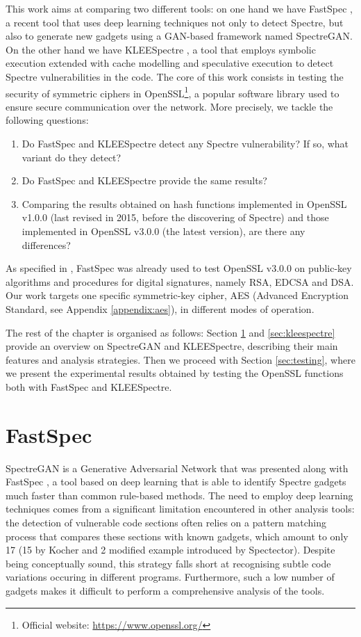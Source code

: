 \documentclass[12pt,a4paper]{book}
\theoremstyle{definition}
\begin{document}
	This work aims at comparing two different tools: on one hand we have FastSpec \cite{Tol2021}, a recent tool that uses deep learning techniques not only to detect Spectre, but also to generate new gadgets using a GAN-based framework named SpectreGAN. On the other hand we have KLEESpectre \cite{Wang2020}, a tool that employs symbolic execution extended with cache modelling and speculative execution to detect Spectre vulnerabilities in the code. The core of this work consists in testing the security of symmetric ciphers in OpenSSL\footnote{Official website: \url{https://www.openssl.org/}}, a popular software library used to ensure secure communication over the network. 
	More precisely, we tackle the following questions: 
	\begin{enumerate}
		\item Do FastSpec and KLEESpectre detect any Spectre vulnerability? If so, what variant do they detect?
		\item Do FastSpec and KLEESpectre provide the same results?
		\item Comparing the results obtained on hash functions implemented in OpenSSL v1.0.0 (last revised in 2015, before the discovering of Spectre) and those implemented in OpenSSL v3.0.0 (the latest version), are there any differences? 
	\end{enumerate}
	As specified in \cite{Tol2021}, FastSpec was already used to test OpenSSL v3.0.0 on public-key algorithms and procedures for digital signatures, namely RSA, EDCSA and DSA. Our work targets one specific symmetric-key cipher, AES (Advanced Encryption Standard, see Appendix \ref{appendix:aes}), in different modes of operation. 
	
	The rest of the chapter is organised as follows: Section \ref{sec:fastspec} and \ref{sec:kleespectre} provide an overview on SpectreGAN and KLEESpectre, describing their main features and analysis strategies. Then we proceed with Section \ref{sec:testing}, where we present the experimental results obtained by testing the OpenSSL functions both with FastSpec and KLEESpectre. 

	\section{FastSpec}\label{sec:fastspec}
	SpectreGAN is a Generative Adversarial Network that was presented along with FastSpec \cite{Tol2021}, a tool based on deep learning that is able to identify Spectre gadgets much faster than common rule-based methods. The need to employ deep learning techniques comes from a significant limitation encountered in other analysis tools: the detection of vulnerable code sections often relies on a pattern matching process that compares these sections with known gadgets, which amount to only 17 (15 by Kocher \cite{Kocher2018} and 2 modified example introduced by Spectector). Despite being conceptually sound, this strategy falls short at recognising subtle code variations occuring in different programs. Furthermore, such a low number of gadgets makes it difficult to perform a comprehensive analysis of the tools.
	
\end{document}
